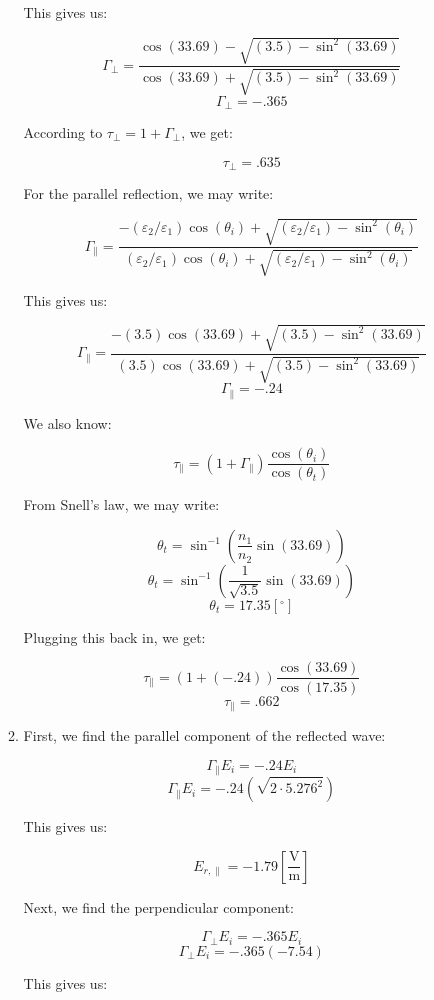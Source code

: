 \begin{enumerate}
\begin{enumerate}
        This gives us:

        $$\Gamma_{\perp}=\frac{\cos(33.69)-\sqrt{(3.5)-\sin^2(33.69)}}{\cos(33.69)+\sqrt{(3.5)-\sin^2(33.69)}}$$
        $$\boxed{\Gamma_{\perp}=-.365}$$

        According to $\tau_{\perp}=1+\Gamma_{\perp}$, we get:

        $$\boxed{\tau_{\perp}=.635}$$

        For the parallel reflection, we may write:

        $$\Gamma_{\parallel}=\frac{-(\varepsilon_2/\varepsilon_1)\cos(\theta_i)+\sqrt{(\varepsilon_2/\varepsilon_1)-\sin^2(\theta_i)}}{(\varepsilon_2/\varepsilon_1)\cos(\theta_i)+\sqrt{(\varepsilon_2/\varepsilon_1)-\sin^2(\theta_i)}}$$

        This gives us:

        $$\Gamma_{\parallel}=\frac{-(3.5)\cos(33.69)+\sqrt{(3.5)-\sin^2(33.69)}}{(3.5)\cos(33.69)+\sqrt{(3.5)-\sin^2(33.69)}}$$
        $$\boxed{\Gamma_{\parallel}=-.24}$$

        We also know:

        $$\tau_{\parallel}=(1+\Gamma_{\parallel})\frac{\cos(\theta_i)}{\cos(\theta_t)}$$

        From Snell's law, we may write:

        $$\theta_t=\sin^{-1}\left( \frac{n_1}{n_2}\sin(33.69) \right)$$
        $$\theta_t=\sin^{-1}\left( \frac{1}{\sqrt{3.5}}\sin(33.69) \right)$$
        $$\theta_t=17.35\left[ ^{\circ} \right]$$

        Plugging this back in, we get:

        $$\tau_{\parallel}=(1+(-.24))\frac{\cos(33.69)}{\cos(17.35)}$$
        $$\boxed{\tau_{\parallel}=.662}$$

      \item 

        First, we find the parallel component of the reflected wave:

        $$\Gamma_{\parallel}E_i=-.24E_i$$
        $$\Gamma_{\parallel}E_i=-.24(\sqrt{2\cdot5.276^2})$$

        This gives us:

        $$E_{r,\parallel}=-1.79\left[ \frac{\si{\volt}}{\si{\meter}} \right]$$

        Next, we find the perpendicular component:

        $$\Gamma_{\perp}E_i=-.365E_i$$
        $$\Gamma_{\perp}E_i=-.365(-7.54)$$

        This gives us:


\end{enumerate}
\end{enumerate}
